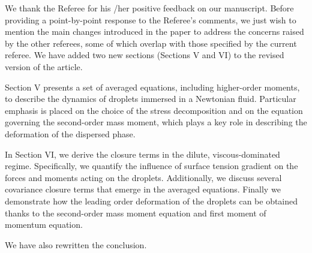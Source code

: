\documentclass[10pt,a4paper]{article}
\newcommand{\tb}[1]{\color{blue}#1\color{black}}
\begin{document}
\tb{We thank the Referee for his /her positive feedback on our manuscript.
Before providing a point-by-point response to the Referee’s comments, we just wish to mention the main changes introduced in the paper to address the concerns raised by the other referees, some of which overlap with
those specified by the current referee.
We have added two new sections (Sections V and VI) to the revised version of the article.

Section V presents a set of averaged equations, including higher-order moments, to describe the dynamics of droplets immersed in a Newtonian fluid. 
Particular emphasis is placed on the choice of the stress decomposition and on the equation governing the second-order mass moment, which plays a key role in describing the deformation of the dispersed phase.

In Section VI, we derive the closure terms in the dilute, viscous-dominated regime. 
Specifically, we quantify the influence of surface tension gradient on the forces and moments acting on the droplets. 
Additionally, we discuss several covariance closure terms that emerge in the averaged equations.
Finally we demonstrate how the leading order deformation of the droplets can be obtained thanks to the second-order mass moment equation and first moment of momentum equation.

We have also rewritten the conclusion.


}
\end{document}
